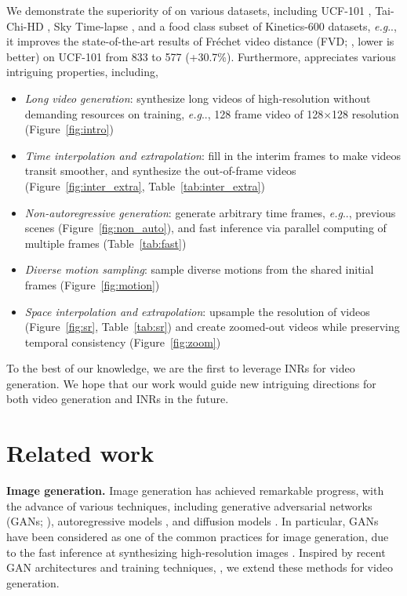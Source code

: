 \documentclass{article} \usepackage{iclr2022_conference,times}
\makeatletter
\DeclareRobustCommand\onedot{\futurelet\@let@token\@onedot}
\def\@onedot{\ifx\@let@token.\else.\null\fi\xspace}
\def\eg{\emph{e.g}\onedot} \def\Eg{\emph{E.g}\onedot}
\makeatother
\begin{document}
We demonstrate the superiority of \sname on various datasets, including UCF-101 \citep{soomro2012ucf101}, Tai-Chi-HD \citep{siarohin2019first}, Sky Time-lapse \citep{xiong2018learning}, and a food class subset of Kinetics-600 \citep{carreira2018short} datasets, \eg, it improves the state-of-the-art results of Fr\'echet video distance (FVD; \citet{unterthiner2018towards}, lower is better) on UCF-101 from 833 to 577 (+30.7\%). Furthermore,  \sname appreciates various intriguing properties, including,
\begin{itemize}[topsep=0.0pt,itemsep=1.0pt,leftmargin=5.5mm]
    \item \emph{Long video generation}: 
    synthesize long videos of high-resolution without demanding resources on training, \eg, 128 frame video of 128$\times$128 resolution
    (Figure~\ref{fig:intro})
    \item \emph{Time interpolation and extrapolation}: fill in the interim frames to make videos transit smoother, and synthesize the out-of-frame videos (Figure~\ref{fig:inter_extra}, Table~\ref{tab:inter_extra})
    \item \emph{Non-autoregressive generation}: generate arbitrary time frames, \eg, previous scenes (Figure~\ref{fig:non_auto}), and fast inference via parallel computing of multiple frames (Table~\ref{tab:fast})
    \item \emph{Diverse motion sampling}: sample diverse motions from the shared initial frames (Figure~\ref{fig:motion})
    \item \emph{Space interpolation and extrapolation}: upsample the resolution of videos (Figure~\ref{fig:sr}, Table~\ref{tab:sr}) and create zoomed-out videos while preserving temporal consistency (Figure~\ref{fig:zoom})
\end{itemize}
To the best of our knowledge, we are the first to leverage INRs for video generation. We hope that our work would guide new intriguing directions for both video generation and INRs in the future.


\section{Related work}
\label{sec:related}

\textbf{Image generation.}
Image generation has achieved remarkable progress, with the advance of various techniques, including generative adversarial networks (GANs; \citet{goodfellow2014generative}), autoregressive models \citep{ramesh2021zero}, and diffusion models \citep{dhariwal2021diffusion}. In particular, GANs have been considered as one of the common practices for image generation, due to the fast inference at synthesizing high-resolution images \citep{brock2018large,karras2020analyzing,karras2021alias}. Inspired by recent GAN architectures \citep{karras2020analyzing,skorokhodov2021adversarial} and training techniques, \citep{zhao2020differentiable,karras2020training}, we extend these methods for video generation.
\end{document}

